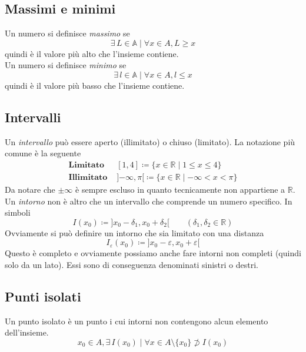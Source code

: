 \subsection{Massimi e minimi}
Un numero si definisce \emph{massimo} se
\begin{equation*}
  \exists\,L\in\mathbb{A}\mid\forall x\in A, L\geq x
\end{equation*}
quindi è il valore più alto che l'insieme contiene.\\
Un numero si definisce \emph{minimo} se
\begin{equation*}
  \exists\,l\in\mathbb{A}\mid\forall x\in A, l\leq x
\end{equation*}
quindi è il valore più basso che l'insieme contiene.

\subsection{Intervalli}
Un \emph{intervallo} può essere aperto (illimitato) o chiuso (limitato). La notazione più comune è la 
seguente
\begin{align*}
  \textbf{Limitato }&{[{1},{4}]}\coloneqq\{x\in\mathbb{R}\mid1\leq x \leq4\}\\
  \textbf{Illimitato }&{]{-\infty},{\pi}[}\coloneq\{x\in\mathbb{R}\mid-\infty<x<\pi\}
\end{align*}
Da notare che $\pm\infty$ è sempre escluso in quanto tecnicamente non appartiene a $\mathbb{R}$.\\
Un \emph{intorno} non è altro che un intervallo che comprende un numero specifico. In simboli
\begin{equation*}
  I(x_0)\coloneqq{]{x_0-\delta_1},{x_0+\delta_2}[} \qquad(\delta_1,\delta_2\in\mathbb{R})
\end{equation*}
Ovviamente si può definire un intorno che sia limitato con una distanza
\begin{equation*}
  I_\varepsilon(x_0)\coloneqq{]{x_0-\varepsilon},{x_0+\varepsilon}[} 
\end{equation*}
Questo è completo e ovviamente possiamo anche fare intorni non completi (quindi solo da un lato). Essi 
sono di conseguenza denominati sinistri o destri.

\subsection{Punti isolati}
Un punto isolato è un punto i cui intorni non contengono alcun elemento dell'insieme.
\begin{equation*}
  x_0\in A, \exists\,I(x_0)\mid\forall x\in A\setminus\{x_0\}\not\supset I(x_0)
\end{equation*}

